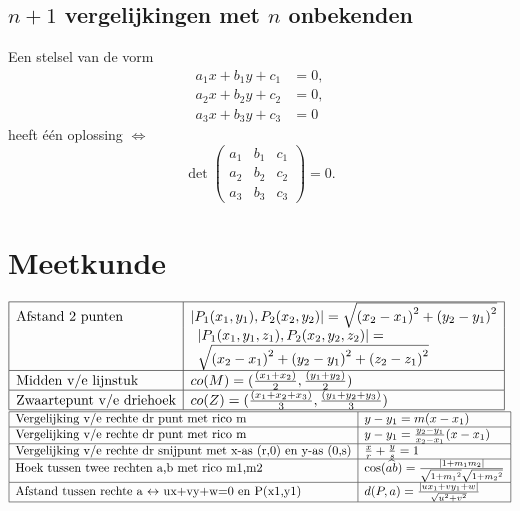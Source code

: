 \documentclass[a5paper]{article}
\begin{document}
\subsection{$n+1$ vergelijkingen met $n$ onbekenden}
Een stelsel van de vorm
\begin{align*}
a_1 x + b_1 y + c_1 &= 0,\\
a_2 x + b_2 y + c_2 &= 0,\\
a_3 x + b_3 y + c_3 &= 0
\end{align*}
heeft één oplossing $\Leftrightarrow$
\[
\det \begin{pmatrix}
a_1 & b_1 & c_1 \\
a_2 & b_2 & c_2 \\
a_3 & b_3 & c_3
\end{pmatrix}=0.
\]



\section{Meetkunde}

$
\begin{array}{|l|l|}
\hline
\text{Afstand 2 punten} & \left| {{P_1}({x_1},{y_1}),{P_2}({x_2},{y_2})} \right| = \sqrt {{{({x_2} - {x_1})}^2} + {{({y_2} - {y_1})}^2}}  \\
 & \begin{array}{l}
\left| {{P_1}({x_1},{y_1},{z_1}),{P_2}({x_2},{y_2},{z_2})} \right| = \\
\sqrt {{{({x_2} - {x_1})}^2} + {{({y_2} - {y_1})}^2} + {{({z_2} - {z_1})}^2}} 
\end{array} \\
\hline
\text{Midden v/e lijnstuk} & co(M) = (\frac{{({x_1} + {x_2})}}{2},\frac{{({y_1} + {y_2})}}{2})\\
\hline
\text{Zwaartepunt v/e driehoek} & co(Z) = (\frac{{({x_1} + {x_2} + {x_3})}}{3},\frac{{({y_1} + {y_2} + {y_3})}}{3})\\
\hline
\end{array}
$
\newline
$
\begin{array}{|l|l|}
\hline
\text{Vergelijking v/e rechte dr punt met rico m} & y - {y_1} = m(x - {x_1})  \\
\hline
\text{Vergelijking v/e rechte dr punt met rico m} & y - {y_1} = \frac{{{y_2} - {y_1}}}{{{x_2} - {x_1}}}(x - {x_1})  \\
\hline
\text{Vergelijking v/e rechte dr snijpunt met x-as (r,0) en y-as (0,s)} & \frac{x}{r} + \frac{y}{s} = 1  \\
\hline
\text{Hoek tussen twee rechten a,b met rico m1,m2} & \cos (\widehat {ab}) = \frac{{\left| {1 + {m_1}{m_2}} \right|}}{{\sqrt {1 + {m_1}^2} \sqrt {1 + {m_2}^2} }}  \\
\hline
\text{Afstand tussen rechte a $\leftrightarrow$ ux+vy+w=0 en P(x1,y1)} & d(P,a) = \frac{{\left| {u{x_1} + v{y_1} + w} \right|}}{{\sqrt {{u^2} + {v^2}} }}  \\
\hline
\end{array}
$
\end{document}
